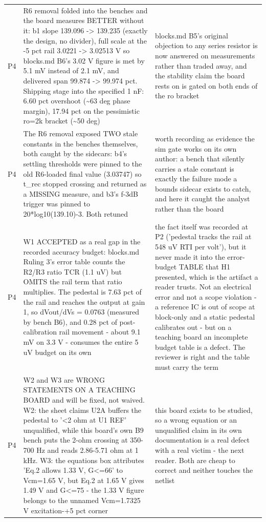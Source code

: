 \documentclass[11pt,a4paper]{article}
\begin{document}
{\begin{longtable}{lp{5.2cm}p{7.2cm}}
P4 & R6 removal folded into the benches and the board measures BETTER without it: b1 slope 139.096 -\textgreater{} 139.235 (exactly the design, no divider), full scale at the -5 pct rail 3.0221 -\textgreater{} 3.02513 V so blocks.md B6's 3.02 V figure is met by 5.1 mV instead of 2.1 mV, and delivered span 99.874 -\textgreater{} 99.974 pct. Shipping stage into the specified 1 nF: 6.60 pct overshoot (\textasciitilde{}63 deg phase margin), 17.94 pct on the pessimistic ro=2k bracket (\textasciitilde{}50 deg) & blocks.md B5's original objection to any series resistor is now answered on measurements rather than traded away, and the stability claim the board rests on is gated on both ends of the ro bracket \\
P4 & The R6 removal exposed TWO stale constants in the benches themselves, both caught by the sidecars: b4's settling thresholds were pinned to the old R6-loaded final value (3.03747) so t\_rec stopped crossing and returned as a MISSING measure, and b3's f-3dB trigger was pinned to 20{*}log10(139.10)-3. Both retuned & worth recording as evidence the sim gate works on its own author: a bench that silently carries a stale constant is exactly the failure mode a bounds sidecar exists to catch, and here it caught the analyst rather than the board \\
P4 & W1 ACCEPTED as a real gap in the recorded accuracy budget: blocks.md Ruling 3's error table counts the R2/R3 ratio TCR (1.1 uV) but OMITS the rail term that ratio multiplies. The pedestal is 7.63 pct of the rail and reaches the output at gain 1, so dVout/dVs = 0.0763 (measured by bench B6), and 0.28 pct of post-calibration rail movement - about 9.1 mV on 3.3 V - consumes the entire 5 uV budget on its own & the fact itself was recorded at P2 ('pedestal tracks the rail at 548 uV RTI per volt'), but it never made it into the error-budget TABLE that H1 presented, which is the artifact a reader trusts. Not an electrical error and not a scope violation - a reference IC is out of scope at block-only and a static pedestal calibrates out - but on a teaching board an incomplete budget table is a defect. The reviewer is right and the table must carry the term \\
P4 & W2 and W3 are WRONG STATEMENTS ON A TEACHING BOARD and will be fixed, not waived. W2: the sheet claims U2A buffers the pedestal to '\textless{}2 ohm at U1 REF' unqualified, while this board's own B9 bench puts the 2-ohm crossing at 350-700 Hz and reads 2.86-5.71 ohm at 1 kHz. W3: the equations box attributes 'Eq.2 allows 1.33 V, G\textless{}=66' to Vcm=1.65 V, but Eq.2 at 1.65 V gives 1.49 V and G\textless{}=75 - the 1.33 V figure belongs to the unnamed Vcm=1.7325 V excitation-+5 pct corner & this board exists to be studied, so a wrong equation or an unqualified claim in its own documentation is a real defect with a real victim - the next reader. Both are cheap to correct and neither touches the netlist \\

\end{longtable}}
\end{document}
